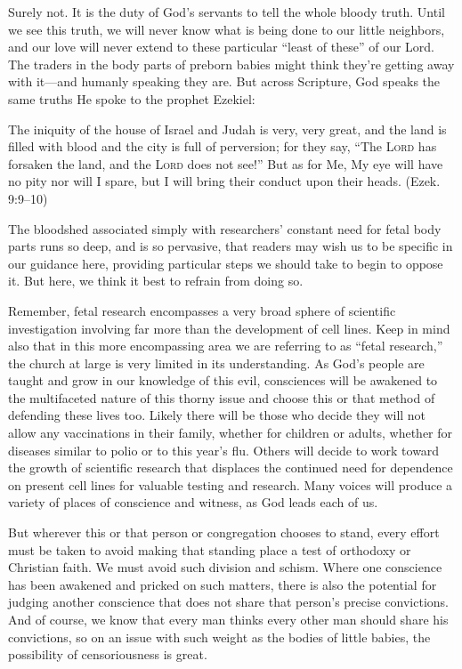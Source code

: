 \documentclass[
]{book}
\begin{document}
Surely not. It is the duty of God's servants to tell the whole bloody truth. Until we see this truth, we will never know what is being done to our little neighbors, and our love will never extend to these particular ``least of these'' of our Lord. The traders in the body parts of preborn babies might think they're getting away with it---and humanly speaking they are. But across Scripture, God speaks the same truths He spoke to the prophet Ezekiel:

The iniquity of the house of Israel and Judah is very, very great, and the land is filled with blood and the city is full of perversion; for they say, ``The \textsc{Lord} has forsaken the land, and the \textsc{Lord} does not see!'' But as for Me, My eye will have no pity nor will I spare, but I will bring their conduct upon their heads. (Ezek. 9:9--10)

The bloodshed associated simply with researchers' constant need for fetal body parts runs so deep, and is so pervasive, that readers may wish us to be specific in our guidance here, providing particular steps we should take to begin to oppose it. But here, we think it best to refrain from doing so.

Remember, fetal research encompasses a very broad sphere of scientific investigation involving far more than the development of cell lines. Keep in mind also that in this more encompassing area we are referring to as ``fetal research,'' the church at large is very limited in its understanding. As God's people are taught and grow in our knowledge of this evil, consciences will be awakened to the multifaceted nature of this thorny issue and choose this or that method of defending these lives too. Likely there will be those who decide they will not allow any vaccinations in their family, whether for children or adults, whether for diseases similar to polio or to this year's flu. Others will decide to work toward the growth of scientific research that displaces the continued need for dependence on present cell lines for valuable testing and research. Many voices will produce a variety of places of conscience and witness, as God leads each of us.

But wherever this or that person or congregation chooses to stand, every effort must be taken to avoid making that standing place a test of orthodoxy or Christian faith. We must avoid such division and schism. Where one conscience has been awakened and pricked on such matters, there is also the potential for judging another conscience that does not share that person's precise convictions. And of course, we know that every man thinks every other man should share his convictions, so on an issue with such weight as the bodies of little babies, the possibility of censoriousness is great.
\end{document}
